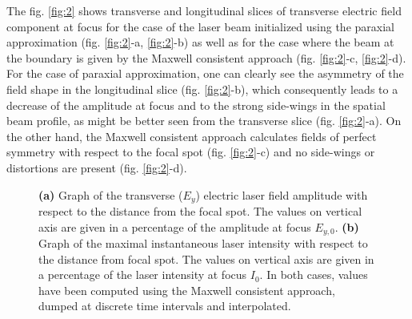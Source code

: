 The fig. \ref{fig:2} shows transverse and longitudinal slices of transverse electric field component at focus for the case of the laser beam initialized using the paraxial approximation (fig. \ref{fig:2}-a, \ref{fig:2}-b) as well as for the case where the beam at the boundary is given by the Maxwell consistent approach (fig. \ref{fig:2}-c, \ref{fig:2}-d). For the case of paraxial approximation, one can clearly see the asymmetry of the field shape in the longitudinal slice (fig. \ref{fig:2}-b), which consequently leads to a decrease of the amplitude at focus and to the strong side-wings in the spatial beam profile, as might be better seen from the transverse slice (fig. \ref{fig:2}-a). On the other hand, the Maxwell consistent approach calculates fields of perfect symmetry with respect to the focal spot (fig. \ref{fig:2}-c) and no side-wings or distortions are present (fig. \ref{fig:2}-d).

\begin{figure}[h!]
	\centering
	\hspace{2mm}
	\caption{\textbf{(a)} Graph of the transverse ($ E_{y} $) electric laser field amplitude with respect to the distance from the focal spot. The values on vertical axis are given in a percentage of the amplitude at focus $ E_{y, 0} $. \textbf{(b)} Graph of the maximal instantaneous laser intensity with respect to the distance from focal spot. The values on vertical axis are given in a percentage of the laser intensity at focus $ I_{0} $. In both cases, values have been computed using the Maxwell consistent approach, dumped at discrete time intervals and interpolated.}
	\label{fig:8}
\end{figure}

